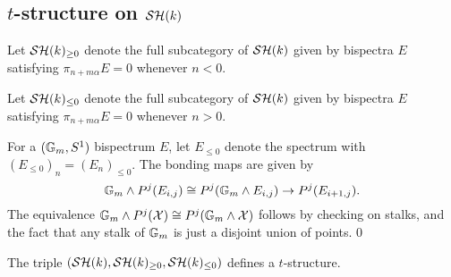 \documentclass{amsart}%
\begin{document}
\subsection{$t$-structure on $\mathcal{SH}(k)$}

\begin{definition}
  Let $\mathcal{SH}(k)_{\geq 0}$ denote the full subcategory of $\mathcal{SH}(k)$ given
  by bispectra $E$ satisfying $\pi_{n+m\alpha}E = 0 $ whenever
  $n < 0$.

  Let $\mathcal{SH}(k)_{\leq 0}$ denote the full subcategory of $\mathcal{SH}(k)$ given
  by bispectra $E$ satisfying $\pi_{n+m\alpha}E = 0$ whenever $n >0$. 
\end{definition}

\begin{definition}
  For a $(\mathbb{G}_m, S^1)$ bispectrum $E$, let $E_{\leq 0}$ denote the
  spectrum with $(E_{\leq 0})_n = (E_n)_{\leq 0}$. The bonding maps
  are given by 
  \begin{equation*}
    \mathbb{G}_m \wedge P^j(E_{i,j}) \cong P^j( \mathbb{G}_m \wedge E_{i,j}) \to P^j( E_{i+1,j}).
  \end{equation*}
  The equivalence
  $\mathbb{G}_m \wedge P^j(\mathcal{X}) \cong P^j(\mathbb{G}_m\wedge \mathcal{X})$ follows by
  checking on stalks, and the fact that any stalk of $\mathbb{G}_m$ is just
  a disjoint union of points. 0 
\end{definition}

\begin{theorem}
  The triple $(\mathcal{SH}(k), \mathcal{SH}(k)_{\geq 0}, \mathcal{SH}(k)_{\leq 0})$ defines a
  $t$-structure.
\end{theorem}
\end{document}
